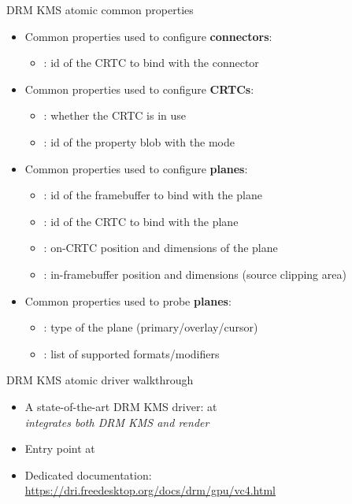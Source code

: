 \begin{frame}[fragile]{DRM KMS atomic common properties}
  \begin{itemize}
  \item Common properties used to configure \textbf{connectors}:
    \begin{itemize}
    \item {}: id of the CRTC to bind with the connector
    \end{itemize}
  \item Common properties used to configure \textbf{CRTCs}:
    \begin{itemize}
    \item {}: whether the CRTC is in use
    \item {}: id of the property blob with the  mode
    \end{itemize}
  \item Common properties used to configure \textbf{planes}:
    \begin{itemize}
    \item {}: id of the framebuffer to bind with the plane
    \item {}: id of the CRTC to bind with the plane
    \item {}: on-CRTC position and dimensions of the plane
    \item {}: in-framebuffer position and dimensions (source clipping area)
    \end{itemize}
  \item Common properties used to probe \textbf{planes}:
    \begin{itemize}
    \item {}: type of the plane (primary/overlay/cursor)
    \item {}: list of supported formats/modifiers
    \end{itemize}
  \end{itemize}
\end{frame}

\begin{frame}[fragile]{DRM KMS atomic driver walkthrough}
  \begin{itemize}
  \item A state-of-the-art DRM KMS driver:  at \\
  \textit{integrates both DRM KMS and render}
  \item Entry point at 
  \item Dedicated documentation: \url{https://dri.freedesktop.org/docs/drm/gpu/vc4.html}
  \end{itemize}
\end{frame}

